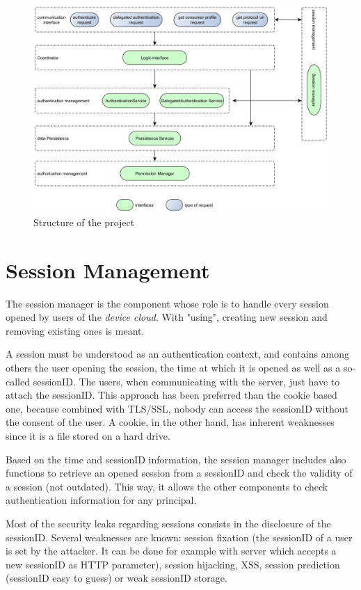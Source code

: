 \begin{figure}[hpbt]
	\centering
	\caption{Structure of the project}
	\label{fig:code_struct}
	\includegraphics[angle=90,width=1\textwidth]{images/code_struct}
\end{figure}

\section{Session Management}
The session manager is the component whose role is to handle every session opened by users of the \emph{device cloud}. With "using", creating new session and removing existing ones is meant. 

A session must be understood as an authentication context, and contains among others the user opening the session, the time at which it is opened as well as a so-called sessionID. The users, when communicating with the server, just have to attach the sessionID. This approach has been preferred than the cookie based one, because combined with TLS/SSL, nobody can access the sessionID without the consent of the user. A cookie, in the other hand, has inherent weaknesses since it is a file stored on a hard drive.

Based on the time and sessionID information, the session manager includes also functions to retrieve an opened session from a sessionID and check the validity of a session (not outdated). This way, it allows the other components to check authentication information for any principal.

Most of the security leaks regarding sessions consists in the disclosure of the sessionID. Several weaknesses are known: session fixation (the sessionID of a user is set by the attacker. It can be done for example with server which accepts a new sessionID as HTTP parameter), session hijacking, XSS, session prediction (sessionID easy to guess) or weak sessionID storage.


